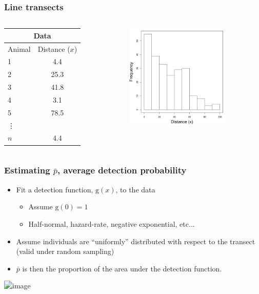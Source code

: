 \documentclass[color=usenames,dvipsnames]{beamer}\usepackage[]{graphicx}\usepackage[]{color}
\begin{document}
\begin{frame}
  \frametitle{Line transects}
  \begin{columns}
    \begin{column}{0.4\textwidth}
      \centering
      \normalsize
      \begin{tabular}{lc}
        \hline
        \multicolumn{2}{c}{Data} \\
        \hline
        Animal & Distance ($x$) \\
        \hline
        1 & 4.4 \\
        2 & 25.3 \\
        3 & 41.8 \\
        4 & 3.1 \\
        5 & 78.5 \\
        \vdots \\
        $n$ & 4.4 \\
        \hline
      \end{tabular}
    \end{column}
    \begin{column}{0.6\textwidth}
      \centering
      \includegraphics[width=5cm]{figs/example1}
    \end{column}
  \end{columns}

\end{frame}



\begin{frame}
  \frametitle{Estimating $\bar{p}$, average detection probability}
  \large
  \begin{itemize}
    \item<1-> Fit a detection function, $\mathrm{g}(x)$, to the data
      \begin{itemize}
        \item Assume $\mathrm{g}(0) = 1$
        \item Half-normal, hazard-rate, negative exponential, etc...
      \end{itemize}
    \item<2-> Assume individuals are ``uniformly'' distributed with
      respect to the transect (valid under random sampling)
    \item<3-> $\bar{p}$ is then the proportion of the area under the
      detection function.
    \end{itemize}
    \includegraphics<1->[width=\textwidth]{figs/detfuns}
\end{frame}
\end{document}
